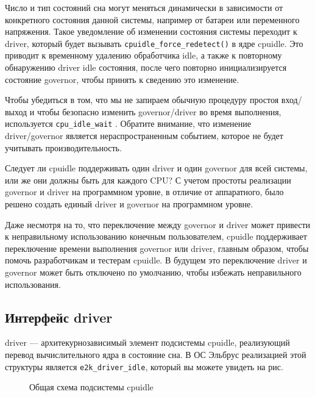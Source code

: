 \documentclass{article}
\begin{document}
Число и тип состояний сна могут меняться динамически в зависимости от конкретного состояния данной системы, например от батареи или переменного напряжения. Такое уведомление об изменении состояния системы переходит к driver, который будет вызывать \texttt{cpuidle\_force\_redetect()} в ядре cpuidle. Это приводит к временному удалению обработчика idle, а также к повторному обнаружению driver idle состояния, после чего повторно инициализируется состояние governor, чтобы принять к сведению это изменение.

Чтобы убедиться в том, что мы не запираем обычную процедуру простоя вход/выход и чтобы безопасно изменить governor/driver во время выполнения, используется \texttt{cpu\_idle\_wait} . Обратите внимание, что изменение driver/governor является нераспространенным событием, которое не будет учитывать производительность.

Следует ли cpuidle поддерживать один driver и один governor для всей системы, или же они должны быть для каждого CPU? С учетом простоты реализации governor и driver на программном уровне, в отличие от аппаратного, было решено создать единый driver и governor на программном уровне.

Даже несмотря на то, что переключение между governor и driver может привести к неправильному использованию конечным пользователем, cpuidle поддерживает переключение времени выполнения governor или driver, главным образом, чтобы помочь разработчикам и тестерам cpuidle. В будущем это переключение driver и governor может быть отключено по умолчанию, чтобы избежать неправильного использования.

\subsection{Интерфейс driver}

driver --- архитекурнозависимый элемент подсистемы cpuidle, реализующий перевод вычислительного ядра в состояние сна. В ОС Эльбрус реализацией этой структуры является \texttt{e2k\_driver\_idle}, который вы можете увидеть на рис.

\begin{figure}[h]
\caption{Общая схема подсистемы cpuidle}
\end{figure}
\end{document}
